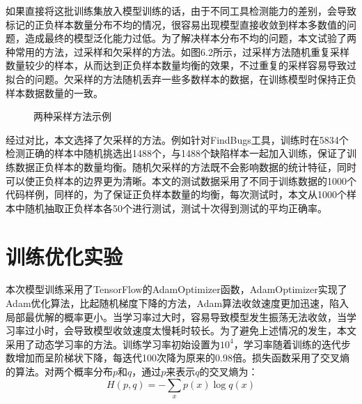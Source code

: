 如果直接将这批训练集放入模型训练的话，由于不同工具检测能力的差别，会导致标记的正负样本数量分布不均的情况，很容易出现模型直接收敛到样本多数值的问题，造成最终的模型泛化能力过低。为了解决样本分布不均的问题，本文试验了两种常用的方法，过采样和欠采样的方法。如图6.2所示，过采样方法随机重复采样数量较少的样本，从而达到正负样本数量均衡的效果，不过重复的采样容易导致过拟合的问题。欠采样的方法随机丢弃一些多数样本的数据，在训练模型时保持正负样本数据数量的一致。

\begin{figure}[h]
	\label{fig:caiyang}
	\centering
	\caption{两种采样方法示例}
\end{figure}

经过对比，本文选择了欠采样的方法。例如针对FindBugs工具，训练时在5834个检测正确的样本中随机挑选出1488个，与1488个缺陷样本一起加入训练，保证了训练数据正负样本的数量均衡。随机欠采样的方法既不会影响数据的统计特征，同时可以使正负样本的边界更为清晰。本文的测试数据采用了不同于训练数据的1000个代码样例，同样的，为了保证正负样本数量的均衡，每次测试时，本文从1000个样本中随机抽取正负样本各50个进行测试，测试十次得到测试的平均正确率。

\section{训练优化实验}
本次模型训练采用了TensorFlow的AdamOptimizer函数，AdamOptimizer实现了Adam优化算法，比起随机梯度下降的方法，Adam算法收敛速度更加迅速，陷入局部最优解的概率更小。当学习率过大时，容易导致模型发生振荡无法收敛，当学习率过小时，会导致模型收敛速度太慢耗时较长。为了避免上述情况的发生，本文采用了动态学习率的方法。训练学习率初始设置为$10^{4}$，学习率随着训练的迭代步数增加而呈阶梯状下降，每迭代100次降为原来的0.98倍。损失函数采用了交叉熵的算法。对两个概率分布$p$和$q$，通过$p$来表示$q$的交叉熵为：
$$H(p,q) = -\sum_x p(x)\log q(x)$$

